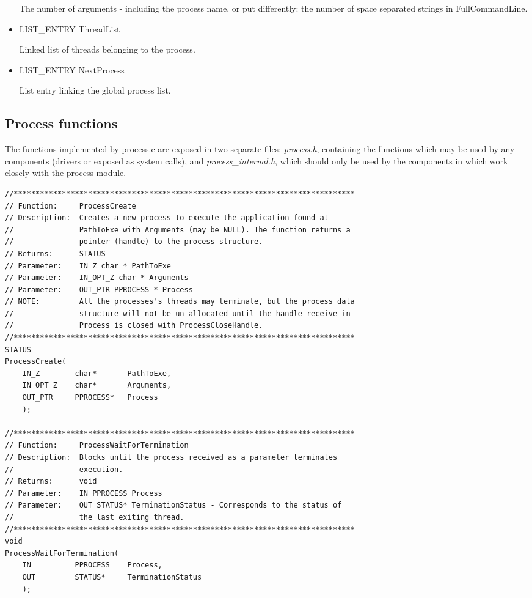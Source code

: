 \begin{appendices}
\begin{itemize}
	The number of arguments - including the process name, or put differently: the number of space
separated strings in FullCommandLine.

	\item LIST\_ENTRY ThreadList

	Linked list of threads belonging to the process.

	\item LIST\_ENTRY NextProcess

	List entry linking the global process list.
\end{itemize}

\subsection{Process functions}

The functions implemented by process.c are exposed in two separate files: \textit{process.h},
containing the functions which may be used by any components (drivers or exposed as system calls),
and \textit{process\_internal.h}, which should only be used by the components in \projectname which
work closely with the process module.

\begin{lstlisting}[caption={Process Public Interface},label={lst:ProcPublic}]
//******************************************************************************
// Function:     ProcessCreate
// Description:  Creates a new process to execute the application found at
//               PathToExe with Arguments (may be NULL). The function returns a
//               pointer (handle) to the process structure.
// Returns:      STATUS
// Parameter:    IN_Z char * PathToExe
// Parameter:    IN_OPT_Z char * Arguments
// Parameter:    OUT_PTR PPROCESS * Process
// NOTE:         All the processes's threads may terminate, but the process data
//               structure will not be un-allocated until the handle receive in
//               Process is closed with ProcessCloseHandle.
//******************************************************************************
STATUS
ProcessCreate(
    IN_Z        char*       PathToExe,
    IN_OPT_Z    char*       Arguments,
    OUT_PTR     PPROCESS*   Process
    );

//******************************************************************************
// Function:     ProcessWaitForTermination
// Description:  Blocks until the process received as a parameter terminates
//               execution.
// Returns:      void
// Parameter:    IN PPROCESS Process
// Parameter:    OUT STATUS* TerminationStatus - Corresponds to the status of
//               the last exiting thread.
//******************************************************************************
void
ProcessWaitForTermination(
    IN          PPROCESS    Process,
    OUT         STATUS*     TerminationStatus
    );


\end{lstlisting}
\end{appendices}
